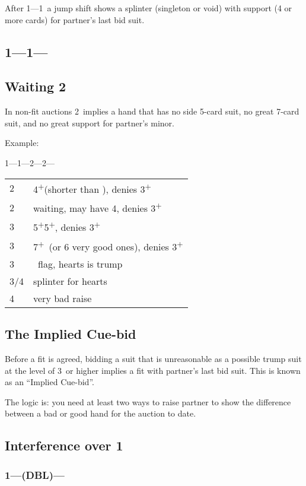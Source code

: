\documentclass[11pt]{article}
\renewcommand{\C}{\texorpdfstring{\textcolor{ForestGreen}{\raisebox{-0.017em}{\ensuremath{\varclub}}}}{C}}
\newcommand{\D}{\texorpdfstring{\textcolor{YellowOrange}{\raisebox{-0.35pt}{\ensuremath{\vardiamond}}}}{D}}
\renewcommand{\H}{\texorpdfstring{\textcolor{Red}{\raisebox{-0.06em}{\ensuremath{\varheart}}}}{H}}
\renewcommand{\S}{\texorpdfstring{\raisebox{-0.03em}{\ensuremath{\varspade}}}{S}}
\newcommand{\N}{\texorpdfstring{\textcolor{Cerulean}{\raisebox{0.15em}{\scalebox{0.72}{\ensuremath{\bigodot}}}}}{NT}}
\newcommand{\+}{\textsuperscript{+}}
\newcommand{\X}{{\footnotesize{DBL}}}
\newenvironment{bidtable}{%
	\begin{tabular}{l l}%
}{%
	\end{tabular}%
}
\begin{document}
After 1\C---1\H\ a jump shift shows a splinter (singleton or void) with support (4 or more cards) for partner's last bid suit.

\subsection[1\C--1\S]{1\C---1\S---} \label{1C1S}

\subsection[Waiting 2\protect\N]{Waiting 2\protect\N}

In non-fit auctions 2\N\ implies a hand that has no side 5-card suit, no great 7-card suit, and no great support for partner's minor.

Example:

1\C---1\H---2\D---2\H---

\begin{bidtable}
    2\S & 4\+\S (shorter than \D), denies 3\+\H \\
    2\N & waiting, may have 4\C, denies 3\+\H \\
    3\C & 5\+\D 5\+\C, denies 3\+\H \\
    3\D & 7\+\D\ (or 6 very good ones), denies 3\+\H \\
    3\H & \H\ flag, hearts is trump \\
    3\S/4\C & splinter for hearts \\
    4\H & very bad raise \\
\end{bidtable}

\subsection{The Implied Cue-bid}

Before a fit is agreed, bidding a suit that is unreasonable as a possible trump suit at the level of 3\D\ or higher implies a fit with partner’s last bid suit. This is known as an ``Implied Cue-bid''.

The logic is: you need at least two ways to raise partner to show the difference between a bad or good hand for the auction to date.
\subsection[Interference over 1\C]{Interference over 1\C}

\subsubsection[1\C--(\X)]{1\C---(\X)---}
\end{document}

